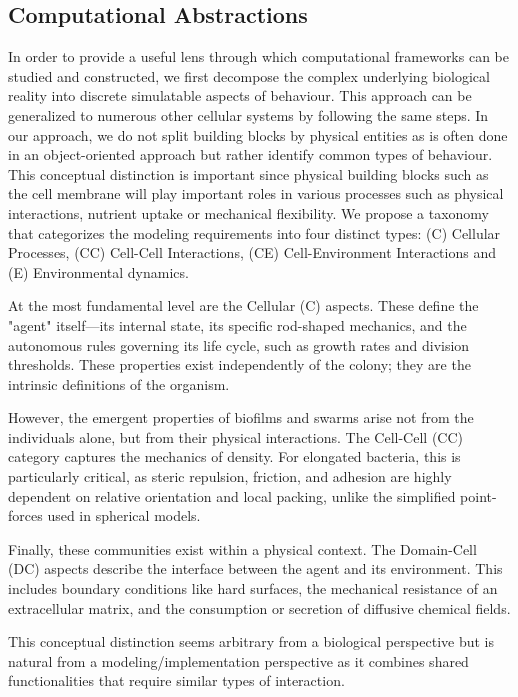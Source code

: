 \subsection{Computational Abstractions}

In order to provide a useful lens through which computational frameworks can be studied
and constructed, we first decompose the complex underlying biological reality into
discrete simulatable aspects of behaviour.
This approach can be generalized to numerous other cellular systems by following the same steps.
In our approach, we do not split building blocks by physical entities as is often done in
an object-oriented approach but rather identify common types of behaviour.
This conceptual distinction is important since physical building blocks such as the cell membrane
will play important roles in various processes such as physical interactions, nutrient
uptake or mechanical flexibility.
We propose a taxonomy that categorizes the modeling requirements into four distinct types: (C)
Cellular Processes, (CC) Cell-Cell Interactions, (CE) Cell-Environment Interactions and
(E) Environmental dynamics.

At the most fundamental level are the Cellular (C) aspects.
These define the "agent" itself—its internal state, its specific rod-shaped mechanics,
and the autonomous rules governing its life cycle, such as growth rates and division thresholds.
These properties exist independently of the colony; they are the intrinsic definitions of
the organism.

However, the emergent properties of biofilms and swarms arise not from the individuals
alone, but from their physical interactions.
The Cell-Cell (CC) category captures the mechanics of density.
For elongated bacteria, this is particularly critical, as steric repulsion, friction, and
adhesion are highly dependent on relative orientation and local packing, unlike the
simplified point-forces used in spherical models.

Finally, these communities exist within a physical context.
The Domain-Cell (DC) aspects describe the interface between the agent and its environment.
This includes boundary conditions like hard surfaces, the mechanical resistance of an
extracellular matrix, and the consumption or secretion of diffusive chemical fields.

This conceptual distinction seems arbitrary from a biological perspective but is natural from a
modeling/implementation perspective as it combines shared functionalities that require similar types
of interaction.

